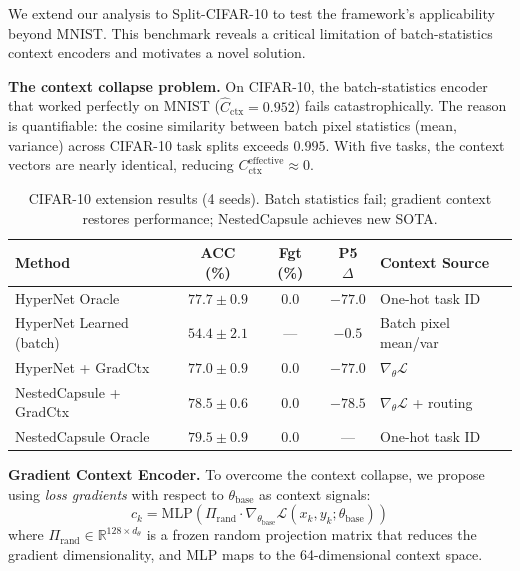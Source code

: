 \documentclass{article}
\begin{document}
We extend our analysis to Split-CIFAR-10 to test the framework's applicability beyond MNIST. This benchmark reveals a critical limitation of batch-statistics context encoders and motivates a novel solution.

\textbf{The context collapse problem.} On CIFAR-10, the batch-statistics encoder that worked perfectly on MNIST ($\hat{C}_\mathrm{ctx} = 0.952$) fails catastrophically. The reason is quantifiable: the cosine similarity between batch pixel statistics (mean, variance) across CIFAR-10 task splits exceeds $0.995$. With five tasks, the context vectors are nearly identical, reducing $C_\mathrm{ctx}^\mathrm{effective} \approx 0$.

\begin{table}[t]
\centering
\caption{CIFAR-10 extension results (4 seeds). Batch statistics fail; gradient context restores performance; NestedCapsule achieves new SOTA.}
\label{tab:cifar10}
\small
\begin{tabular}{lcccl}
\toprule
Method & ACC (\%) & Fgt (\%) & P5 $\Delta$ & Context Source \\
\midrule
HyperNet Oracle            & $77.7 \pm 0.9$ & $0.0$ & $-77.0$ & One-hot task ID \\
HyperNet Learned (batch)   & $54.4 \pm 2.1$ & --- & $-0.5$  & Batch pixel mean/var \\
\midrule
HyperNet + GradCtx         & $77.0 \pm 0.9$ & $0.0$ & $-77.0$ & $\nabla_\theta \mathcal{L}$ \\
NestedCapsule + GradCtx    & $\mathbf{78.5 \pm 0.6}$ & $0.0$ & $-78.5$ & $\nabla_\theta \mathcal{L}$ + routing \\
NestedCapsule Oracle       & $79.5 \pm 0.9$ & $0.0$ & --- & One-hot task ID \\
\bottomrule
\end{tabular}
\end{table}

\textbf{Gradient Context Encoder.} To overcome the context collapse, we propose using \emph{loss gradients} with respect to $\theta_\mathrm{base}$ as context signals:
\begin{equation}
    c_k = \mathrm{MLP}\!\left(\Pi_\mathrm{rand} \cdot \nabla_{\theta_\mathrm{base}} \mathcal{L}(x_k, y_k; \theta_\mathrm{base})\right)
\end{equation}
where $\Pi_\mathrm{rand} \in \mathbb{R}^{128 \times d_\theta}$ is a frozen random projection matrix that reduces the gradient dimensionality, and MLP maps to the 64-dimensional context space.
\end{document}
